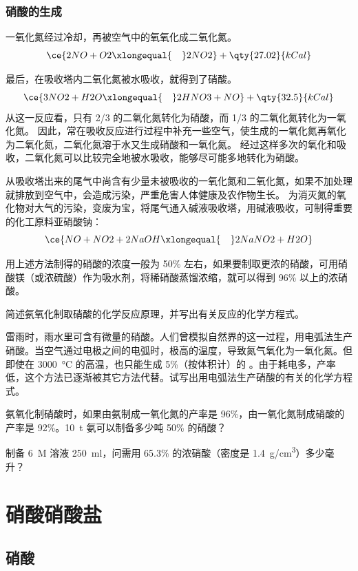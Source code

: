 \subsubsection{硝酸的生成}
一氧化氮经过冷却，再被空气中的氧氧化成二氧化氮。
\[ \ce{ 2NO + O2 \xlongequal{\quad} 2NO2 } + \qty{27.02}{kCal} \]

最后，在吸收塔内二氧化氮被水吸收，就得到了硝酸。
\[ \ce{ 3NO2 + H2O \xlongequal{\quad} 2HNO3 +NO } + \qty{32.5}{kCal} \]
从这一反应看，只有 2/3 的二氧化氮转化为硝酸，而 1/3 的二氧化氮转化为一氧化氮。
因此，常在吸收反应进行过程中补充一些空气，使生成的一氧化氮再氧化为二氧化氮，二氧化氮溶于水又生成硝酸和一氧化氮。
经过这样多次的氧化和吸收，二氧化氮可以比较完全地被水吸收，能够尽可能多地转化为硝酸。

从吸收塔出来的尾气中尚含有少量未被吸收的一氧化氮和二氧化氮，如果不加处理就排放到空气中，会造成污染，严重危害人体健康及农作物生长。
为消灭氮的氧化物对大气的污染，变废为宝，将尾气通入碱液吸收塔，用碱液吸收，可制得重要的化工原料亚硝酸钠：
\[ \ce{ NO + NO2 +2NaOH \xlongequal{\quad} 2NaNO2 + H2O } \]

用上述方法制得的硝酸的浓度一般为 50\% 左右，如果要制取更浓的硝酸，可用硝酸镁（或浓硫酸）作为吸水剂，将稀硝酸蒸馏浓缩，就可以得到 96\% 以上的浓硝酸。

\begin{Practice}[习题]
\begin{question}
  \item 简述氨氧化制取硝酸的化学反应原理，并写出有关反应的化学方程式。
  \item 雷雨时，雨水里可含有微量的硝酸。人们曾模拟自然界的这一过程，用电弧法生产硝酸。当空气通过电极之间的电弧时，极高的温度，导致氮气氧化为一氧化氮。但即使在 \qty{3000}{\celsius} 的高温，也只能生成 5\%（按体积计）的 。由于耗电多，产率低，这个方法已逐渐被其它方法代替。试写出用电弧法生产硝酸的有关的化学方程式。
  \item 氨氧化制硝酸时，如果由氨制成一氧化氮的产率是 96\%，由一氧化氮制成硝酸的产率是 92\%。\qty{10}{t} 氨可以制备多少吨 50\% 的硝酸？
  \item 制备 \qty{6}{M}  溶液 \qty{250}{ml}，问需用 65.3\% 的浓硝酸（密度是 \qty{1.4}{g/cm^3}）多少毫升？
\end{question}
\end{Practice}


\section{硝酸\texorpdfstring{\quad}{ }硝酸盐}
\subsection{硝酸}
